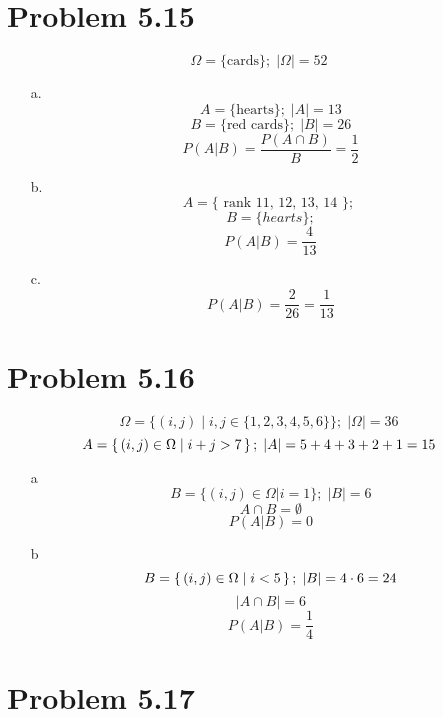 \documentclass[12pt,letterpaper]{article}
\begin{document}
\section*{Problem 5.15}

\[ \Omega = \{\text{cards}\}; \; |\Omega| = 52 \]

\begin{itemize}

    \item[a.]
        \[ A = \{ \text{hearts} \}; \; |A| = 13 \]
        \[ B = \{ \text{red cards} \}; \; |B| = 26  \]
        \[ P(A | B) = \frac{P(A\cap B)}{B} = \frac{1}{2} \]

    \item[b.]
        \[ A = \{\text{ rank 11, 12, 13, 14 } \}; \; \]
        \[ B = \{ hearts \}; \]
        \[ P(A|B) = \frac{4}{13} \]


    \item[c.]
        \[ P(A|B) = \frac{2}{26} = \frac{1}{13} \]


\end{itemize}


\section*{Problem 5.16}

\[ \Omega = \{ (i, j) \mid i, j \in \{1,2,3,4,5,6\} \}; \; |\Omega| = 36 \]
\[ A = \set{ (i, j) \in \Omega  \mid i + j > 7 } ;\; |A| = 5 + 4 + 3 + 2 + 1 = 15 \]

\begin{itemize}

    \item[a] 
        \[ B = \{ (i,j) \in \Omega | i = 1 \} ;\; |B| = 6  \]
        \[ A \cap B = \emptyset \]
        \[ P(A|B) = 0 \]

    \item[b]
        \[ B = \set{ (i,j) \in \Omega \mid i < 5 }; \; |B| = 4 \cdot 6 = 24  \]
        \[ |A \cap B| = 6 \]
        \[ P(A|B) = \frac{1}{4} \]

\end{itemize}


\section*{Problem 5.17}
\end{document}
